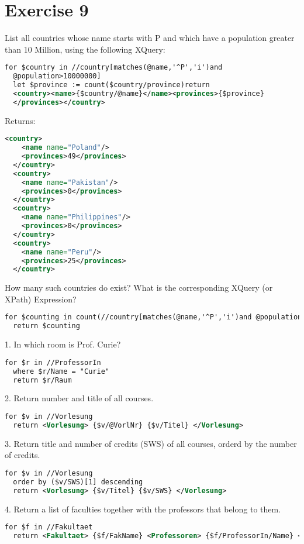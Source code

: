 \section{Exercise 9}
List all countries whose name starts with P and which have a population greater than 10
Million, using the following XQuery:
\begin{lstlisting}[language=XML]
  for $country in //country[matches(@name,'^P','i')and
  @population>10000000]
  let $province := count($country/province)return
  <country><name>{$country/@name}</name><provinces>{$province}
  </provinces></country>
\end{lstlisting}
Returns:
\begin{lstlisting}[language=XML]
  <country>
    <name name="Poland"/>
    <provinces>49</provinces>
  </country>
  <country>
    <name name="Pakistan"/>
    <provinces>0</provinces>
  </country>
  <country>
    <name name="Philippines"/>
    <provinces>0</provinces>
  </country>
  <country>
    <name name="Peru"/>
    <provinces>25</provinces>
  </country>
\end{lstlisting}
How many such countries do exist? What is the corresponding XQuery (or XPath) Expression?
\begin{lstlisting}[language=XML]
  for $counting in count(//country[matches(@name,'^P','i')and @population>10000000])
  return $counting
\end{lstlisting}


1. In	which	room	is	Prof.	Curie?
\begin{lstlisting}[language=XML]
  for $r in //ProfessorIn
  where $r/Name = "Curie"
  return $r/Raum
\end{lstlisting}

2. Return	number	and	title	of	all	courses.
\begin{lstlisting}[language=XML]
  for $v in //Vorlesung
  return <Vorlesung> {$v/@VorlNr} {$v/Titel} </Vorlesung>
\end{lstlisting}

3. Return	title	and	number	of	credits	(SWS)	of	all	courses,	orderd	by	the	number	of	credits.
\begin{lstlisting}[language=XML]
  for $v in //Vorlesung
  order by ($v/SWS)[1] descending
  return <Vorlesung> {$v/Titel} {$v/SWS} </Vorlesung>
\end{lstlisting}

4. Return	a	list	of	faculties	together	with	the	professors	that	belong	to	them.
\begin{lstlisting}[language=XML]
  for $f in //Fakultaet
  return <Fakultaet> {$f/FakName} <Professoren> {$f/ProfessorIn/Name} </Professoren> </Fakultaet>
\end{lstlisting}

